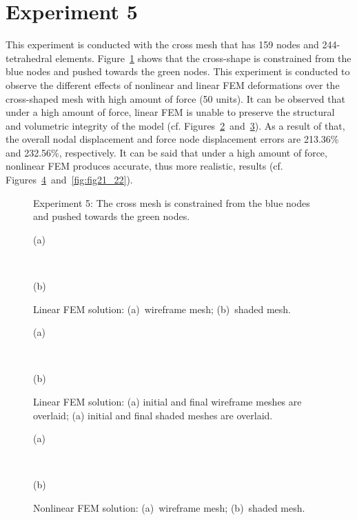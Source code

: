 \clearpage

\section{Experiment 5}
\label{v}

This experiment is conducted with the cross mesh that has 159 nodes and 244-tetrahedral elements. Figure~\ref{fig:fig14} shows that the cross-shape is constrained from the blue nodes and pushed towards the green nodes. This experiment is conducted to observe the different effects of nonlinear and linear FEM deformations over the cross-shaped mesh with high amount of force (50 units). It can be observed that under a high amount of force, linear FEM is unable to preserve the structural and volumetric integrity of the model (cf. Figures~\ref{fig:fig15_16}~and~\ref{fig:fig17_18}). As a result of that, the overall nodal displacement and force node displacement errors are 213.36\% and 232.56\%, respectively. It can be said that under a high amount of force, nonlinear FEM produces accurate, thus more realistic, results (cf. Figures~\ref{fig:fig19_20}~and~\ref{fig:fig21_22}).

\begin{figure}[h]
\centerline{}
\caption{Experiment 5: The cross mesh is constrained from the blue nodes and pushed towards the green nodes.}
\label{fig:fig14}
\end{figure}

\begin{figure}[h]
\centerline{}
\centerline{(a)}
\centerline{\ }
\centerline{}
\centerline{(b)}
\caption{Linear FEM solution: (a)~wireframe mesh; (b)~shaded mesh.}
\label{fig:fig15_16}
\end{figure}

\begin{figure}[h]
\centerline{}
\centerline{(a)}
\centerline{\ }
\centerline{}
\centerline{(b)}
\caption{Linear FEM solution: (a) initial and final wireframe meshes are overlaid; (a) initial and final shaded meshes are overlaid.}
\label{fig:fig17_18}
\end{figure}

\begin{figure}[h]
\centerline{}
\centerline{(a)}
\centerline{\ }
\centerline{}
\centerline{(b)}
\caption{Nonlinear FEM solution: (a)~wireframe mesh; (b)~shaded mesh.}
\label{fig:fig19_20}
\end{figure}

